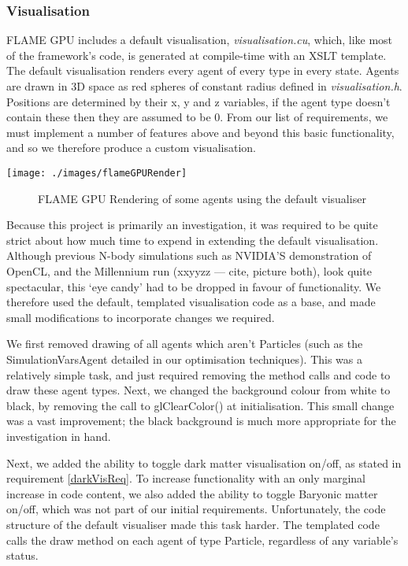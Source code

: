 \documentclass[11pt,a4paper]{article}
\begin{document}
\subsubsection{Visualisation}
FLAME GPU includes a default visualisation, \emph{visualisation.cu}, which, like most of the framework's code, is generated at compile-time with an XSLT template. The default visualisation renders every agent of every type in every state. Agents are drawn in 3D space as red spheres of constant radius defined in \emph{visualisation.h}. Positions are determined by their x, y and z variables, if the agent type doesn't contain these then they are assumed to be 0. From our list of requirements, we must implement a number of features above and beyond this basic functionality, and so we therefore produce a custom visualisation.
\begin{center}
\texttt{[image: ./images/flameGPURender]}
\begin{figure}[H]
\caption[FLAME GPU Default rendering]{FLAME GPU Rendering of some agents using the default visualiser}
\end{figure}
\end{center}
Because this project is primarily an investigation, it was required to be quite strict about how much time to expend in extending the default visualisation. Although previous N-body simulations such as NVIDIA'S demonstration of OpenCL, and the Millennium run (xxyyzz --- cite, picture both), look quite spectacular, this `eye candy' had to be dropped in favour of functionality. We therefore used the default, templated visualisation code as a base, and made small modifications to incorporate changes we required.

We first removed drawing of all agents which aren't Particles (such as the SimulationVarsAgent detailed in our optimisation techniques). This was a relatively simple task, and just required removing the method calls and code to draw these agent types. Next, we changed the background colour from white to black, by removing the call to glClearColor() at initialisation. This small change was a vast improvement; the black background is much more appropriate for the investigation in hand. 

Next, we added the ability to toggle dark matter visualisation on/off, as stated in requirement \ref{darkVisReq}. To increase functionality with an only marginal increase in code content, we also added the ability to toggle Baryonic matter on/off, which was not part of our initial requirements. Unfortunately, the code structure of the default visualiser made this task harder. The templated code calls the draw method on each agent of type Particle, regardless of any variable's status.
\end{document}
